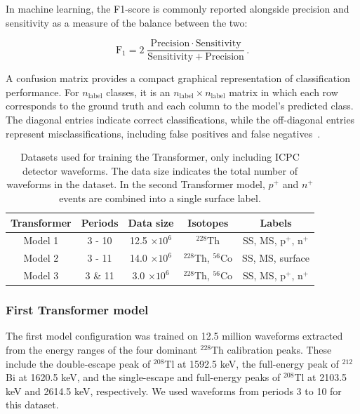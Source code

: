 In machine learning, the F1-score is commonly reported alongside precision and sensitivity as a measure of the balance between the two:

\begin{equation}
\label{eq:f1_score}
	\mathrm{F_1} = 2 \; \frac{\mathrm{Precision} \cdot \mathrm{Sensitivity}}{\mathrm{Sensitivity + Precision}} \,.
\end{equation}


A confusion matrix provides a compact graphical representation of classification performance. For $n_{\mathrm{label}}$ classes, it is an $n_{\mathrm{label}} \times n_{\mathrm{label}}$ matrix in which each row corresponds to the ground truth and each column to the model's predicted class. The diagonal entries indicate correct classifications, while the off-diagonal entries represent misclassifications, including false positives and false negatives~\cite{murphy_probabilistic_2022}.  

\begin{table}
\centering
\caption{Datasets used for training the Transformer, only including ICPC detector waveforms. The data size indicates the total number of waveforms in the dataset. In the second Transformer model, $p^{+}$ and $n^{+}$ events are combined into a single surface label.}
\begin{tabular}{||c | c | c | c | c||} 
 \hline
 \textbf{Transformer} & \textbf{Periods} & \textbf{Data size} & \textbf{Isotopes} & \textbf{Labels} \\ 
 \hline
 Model 1 & 3 - 10 & 12.5 $\times 10^6$ & $^{228}$Th & SS, MS, p$^{+}$, n$^{+}$ \\ 
 \hline
 Model 2 & 3 - 11 & 14.0 $\times 10^6$ & $^{228}$Th, $^{56}$Co & SS, MS, surface \\
 \hline
 Model 3 & 3 \& 11 & 3.0 $\times 10^6$ & $^{228}$Th, $^{56}$Co & SS, MS, p$^{+}$, n$^{+}$ \\
 \hline
\end{tabular}
\label{tab:Datasets_overview}
\end{table}


\subsubsection{First Transformer model}

The first model configuration was trained on 12.5 million waveforms extracted from the energy ranges of the four dominant $^{228}$Th calibration peaks. These include the double-escape peak of $^{208}$Tl at 1592.5 keV, the full-energy peak of $^{212}$Bi at 1620.5 keV, and the single-escape and full-energy peaks of $^{208}$Tl at 2103.5 keV and 2614.5 keV, respectively. 
We used waveforms from periods 3 to 10 for this dataset. 

